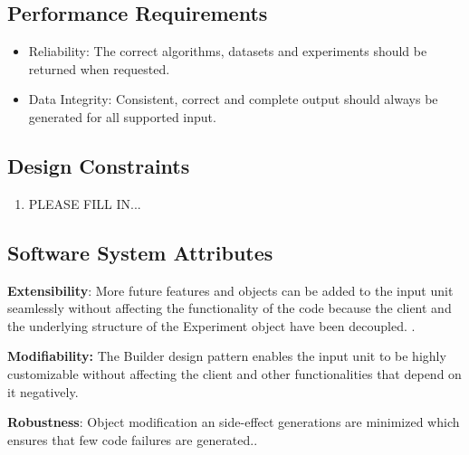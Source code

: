 \subsection{Performance Requirements}
\begin{itemize}
	\item Reliability: The correct algorithms, datasets and experiments should be returned when requested. \newline
    \item Data Integrity: Consistent, correct and complete output should always be generated for all supported input. \newline
\end{itemize}
\subsection{Design Constraints}
\begin{enumerate}
	\item PLEASE FILL IN...
\end{enumerate}
\subsection{Software System Attributes}
\begin{flushleft}
    \par\textbf{Extensibility}: More future features and objects can be added to the input unit seamlessly without affecting the functionality of the code because the client and the underlying structure of the Experiment object have been decoupled. .\newline
    
    \par\textbf{Modifiability: } The Builder design pattern enables the input unit to be highly customizable without affecting the client and other functionalities that depend on it negatively.\newline
  
    \par\textbf{Robustness}: Object modification an side-effect generations are minimized which ensures that few code failures are generated.. \newline
    \end{flushleft}

